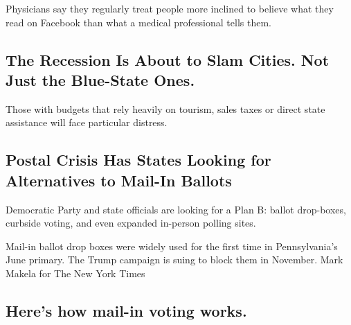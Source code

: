 Physicians say they regularly treat people more inclined to believe what
they read on Facebook than what a medical professional tells them.

\href{/2020/08/17/upshot/pandemic-recession-cities-fiscal-shortfall.html}{}

\href{/2020/08/17/upshot/pandemic-recession-cities-fiscal-shortfall.html}{}

\hypertarget{the-recession-is-about-to-slam-cities-not-just-the-blue-state-ones}{%
\subsection{The Recession Is About to Slam Cities. Not Just the
Blue-State
Ones.}\label{the-recession-is-about-to-slam-cities-not-just-the-blue-state-ones}}

Those with budgets that rely heavily on tourism, sales taxes or direct
state assistance will face particular distress.

\href{/2020/08/17/us/politics/postal-service-voting.html}{}

\hypertarget{postal-crisis-has-states-looking-for-alternatives-to-mail-in-ballots}{%
\subsection{Postal Crisis Has States Looking for Alternatives to Mail-In
Ballots}\label{postal-crisis-has-states-looking-for-alternatives-to-mail-in-ballots}}

Democratic Party and state officials are looking for a Plan B: ballot
drop-boxes, curbside voting, and even expanded in-person polling sites.

\href{/2020/08/17/us/politics/postal-service-voting.html}{}

\href{/2020/08/17/us/politics/postal-service-voting.html}{}

Mail-in ballot drop boxes were widely used for the first time in
Pennsylvania's June primary. The Trump campaign is suing to block them
in November. Mark Makela for The New York Times

\href{/article/Vote-by-mail.html}{}

\hypertarget{heres-how-mail-in-voting-works}{%
\subsection{Here's how mail-in voting
works.}\label{heres-how-mail-in-voting-works}}

\href{/2020/08/17/world/europe/belarus-lukashenko-protests.html}{}

